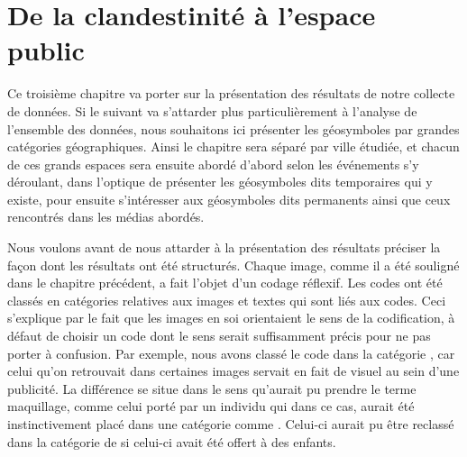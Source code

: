 
\chapter{De la clandestinité à l'espace public}
\label{cha:de_la_clandestinite_a_l_espace_public}


Ce troisième chapitre va porter sur la présentation des résultats de notre collecte de données.
Si le suivant va s'attarder plus particulièrement à l'analyse de l'ensemble des données, nous souhaitons ici présenter les géosymboles par grandes catégories géographiques.
Ainsi le chapitre sera séparé par ville étudiée, et chacun de ces grands espaces sera ensuite abordé d'abord selon les événements s'y déroulant, dans l'optique de présenter les géosymboles dits temporaires qui y existe, pour ensuite s'intéresser aux géosymboles dits permanents ainsi que ceux rencontrés dans les médias abordés.

Nous voulons avant de nous attarder à la présentation des résultats préciser la façon dont les résultats ont été structurés.
Chaque image, comme il a été souligné dans le chapitre précédent, a fait l'objet d'un codage réflexif.
Les codes ont été classés en catégories relatives aux images et textes qui sont liés aux codes.
Ceci s'explique par le fait que les images en soi orientaient le sens de la codification, à défaut de choisir un code dont le sens serait suffisamment précis pour ne pas porter à confusion.
Par exemple, nous avons classé le code  dans la catégorie , car celui qu'on retrouvait dans certaines images servait en fait de visuel au sein d'une publicité.
La différence se situe dans le sens qu'aurait pu prendre le terme maquillage, comme celui porté par un individu qui dans ce cas, aurait été instinctivement placé dans une catégorie comme .
Celui-ci aurait pu être reclassé dans la catégorie de  si celui-ci avait été offert à des enfants.

